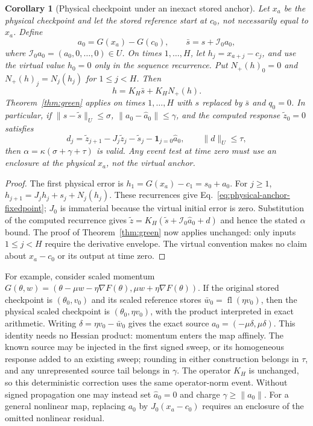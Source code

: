\documentclass{article}
\newtheorem{corollary}{Corollary}
\begin{document}
\begin{corollary}[Physical checkpoint under an inexact stored anchor]
\label{cor:physical-anchor}
Let $x_a$ be the physical checkpoint and let the stored reference start at
$c_0$, not necessarily equal to $x_a$.  Define
\begin{equation}
 a_0=G(x_a)-G(c_0),\qquad
 \bar s=s+\mathcal I_0a_0,
 \label{eq:physical-anchor-injection}
\end{equation}
where $\mathcal I_0a_0=(a_0,0,\ldots,0)\in U$.  On times $1,\ldots,H$, let
$h_j=x_{a+j}-c_j$, and use the virtual value $h_0=0$ only in the sequence
recurrence.  Put $N_+(h)_0=0$ and $N_+(h)_j=N_j(h_j)$ for $1\le j<H$.
Then
\begin{equation}
 h=K_H\bar s+K_HN_+(h).
 \label{eq:physical-anchor-fixedpoint}
\end{equation}
Theorem~\ref{thm:green} applies on times $1,\ldots,H$ with $s$ replaced by
$\bar s$ and $q_0=0$.  In particular, if
$\|s-\widetilde s\|_U\le\sigma$, $\|a_0-\widehat a_0\|\le\gamma$, and
the computed response $\widetilde z_0=0$ satisfies
\begin{equation}
 d_j=\widetilde z_{j+1}-J_j\widetilde z_j-\widetilde s_j
       -\mathbf 1_{j=0}\widehat a_0,\qquad \|d\|_U\le\tau,
\end{equation}
then $\alpha=\kappa(\sigma+\gamma+\tau)$ is valid.  Any event test at time
zero must use an enclosure at the physical $x_a$, not the virtual anchor.
\end{corollary}

\begin{proof}
The first physical error is $h_1=G(x_a)-c_1=s_0+a_0$.  For $j\ge1$,
$h_{j+1}=J_jh_j+s_j+N_j(h_j)$.  These recurrences give
Eq.~\eqref{eq:physical-anchor-fixedpoint}; $J_0$ is immaterial because the
virtual initial error is zero.  Substitution of the computed recurrence
gives $\widetilde z=K_H(\widetilde s+\mathcal I_0\widehat a_0+d)$ and hence
the stated $\alpha$ bound.  The proof of Theorem~\ref{thm:green} now applies
unchanged: only inputs $1\le j<H$ require the derivative envelope.  The
virtual convention makes no claim about $x_a-c_0$ or its output at time zero.
\end{proof}

For example, consider scaled momentum
$G(\theta,w)=(\theta-\mu w-\eta\nabla F(\theta),\mu w+\eta\nabla F(\theta))$.
If the original stored checkpoint is $(\theta_0,v_0)$ and its scaled
reference stores $\bar w_0=\operatorname{fl}(\eta v_0)$, then the physical
scaled checkpoint is $(\theta_0,\eta v_0)$, with the product interpreted in
exact arithmetic.  Writing $\delta=\eta v_0-\bar w_0$ gives the exact source
$a_0=(-\mu\delta,\mu\delta)$.  This identity needs no Hessian product:
momentum enters the map affinely.  The known source may be injected in the
first signed sweep, or its homogeneous response added to an existing sweep;
rounding in either construction belongs in $\tau$, and any unrepresented
source tail belongs in $\gamma$.  The operator $K_H$ is unchanged, so this
deterministic correction uses the same operator-norm event.  Without signed
propagation one may instead set $\widehat a_0=0$ and charge
$\gamma\ge\|a_0\|$.  For a general nonlinear map, replacing $a_0$ by
$J_0(x_a-c_0)$ requires an enclosure of the omitted nonlinear residual.
\end{document}
